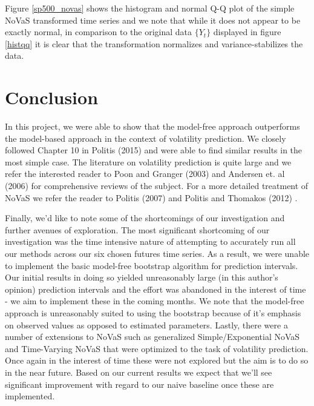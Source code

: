 \documentclass[11pt,]{article}
\begin{document}
Figure \ref{sp500_novas} shows the histogram and normal Q-Q plot of the simple NoVaS transformed time series and we note that while it does not appear to be exactly normal, in comparison to the original data $\{Y_t\}$ displayed in figure \ref{histqq} it is clear that the transformation normalizes and variance-stabilizes the data.

\section{Conclusion}
In this project, we were able to show that the model-free approach outperforms the model-based approach in the context of volatility prediction. We closely followed Chapter 10 in Politis (2015) \cite{Politis2015} and were able to find similar results in the most simple case. The literature on volatility prediction is quite large and we refer the interested reader to Poon and Granger (2003) \cite{PoonGranger2003} and Andersen et. al (2006) \cite{Andersen2006} for comprehensive reviews of the subject. For a more detailed treatment of NoVaS we refer the reader to Politis (2007) \cite{Politis2007} and Politis and Thomakos (2012) \cite{Politis2012}. 

Finally, we'd like to note some of the shortcomings of our investigation and further avenues of exploration. The most significant shortcoming of our investigation was the time intensive nature of attempting to accurately run all our methods across our six chosen futures time series. As a result, we were unable to implement the basic model-free bootstrap algorithm for prediction intervals. Our initial results in doing so yielded unreasonably large (in this author's opinion) prediction intervals and the effort was abandoned in the interest of time - we aim to implement these in the coming months. We note that the model-free approach is unreasonably suited to using the bootstrap because of it's emphasis on observed values as opposed to estimated parameters. Lastly, there were a number of extensions to NoVaS such as generalized Simple/Exponential NoVaS and Time-Varying NoVaS that were optimized to the task of volatility prediction. Once again in the interest of time these were not explored but the aim is to do so in the near future. Based on our current results we expect that we'll see significant improvement with regard to our naive baseline once these are implemented.
\vspace{-0.7cm}
\nocite{*}


\end{document}
